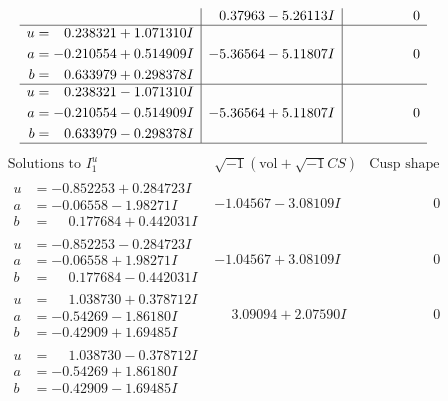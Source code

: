 \documentclass[1p]{elsarticle_modified}
\theoremstyle{definition}
\newcommand{\I}{\sqrt{-1}}
\begin{document}
$$\begin{array}{c|c|c}
 & \phantom{-}0.37963 - 5.26113 I & \phantom{-0.000000 } 0 \\ \hline\begin{aligned}
u &= \phantom{-}0.238321 + 1.071310 I \\
a &= -0.210554 + 0.514909 I \\
b &= \phantom{-}0.633979 + 0.298378 I\end{aligned}
 & -5.36564 - 5.11807 I & \phantom{-0.000000 } 0 \\ \hline\begin{aligned}
u &= \phantom{-}0.238321 - 1.071310 I \\
a &= -0.210554 - 0.514909 I \\
b &= \phantom{-}0.633979 - 0.298378 I\end{aligned}
 & -5.36564 + 5.11807 I & \phantom{-0.000000 } 0\\
 \hline 
 \end{array}$$\newpage$$\begin{array}{c|c|c}  
\text{Solutions to }I^u_{1}& \I (\text{vol} + \sqrt{-1}CS) & \text{Cusp shape}\\
 \hline 
\begin{aligned}
u &= -0.852253 + 0.284723 I \\
a &= -0.06558 - 1.98271 I \\
b &= \phantom{-}0.177684 + 0.442031 I\end{aligned}
 & -1.04567 - 3.08109 I & \phantom{-0.000000 } 0 \\ \hline\begin{aligned}
u &= -0.852253 - 0.284723 I \\
a &= -0.06558 + 1.98271 I \\
b &= \phantom{-}0.177684 - 0.442031 I\end{aligned}
 & -1.04567 + 3.08109 I & \phantom{-0.000000 } 0 \\ \hline\begin{aligned}
u &= \phantom{-}1.038730 + 0.378712 I \\
a &= -0.54269 - 1.86180 I \\
b &= -0.42909 + 1.69485 I\end{aligned}
 & \phantom{-}3.09094 + 2.07590 I & \phantom{-0.000000 } 0 \\ \hline\begin{aligned}
u &= \phantom{-}1.038730 - 0.378712 I \\
a &= -0.54269 + 1.86180 I \\
b &= -0.42909 - 1.69485 I\end{aligned}

\end{array}$$
\end{document}
